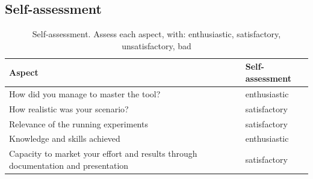 \documentclass[a4paper,12pt]{report}
\begin{document}

\subsection{Self-assessment}

\begin{table}
\begin{tabular}{ll}
Aspect & Self-assessment\\ \hline
How did you manage to master the tool?& enthusiastic\\
How realistic was your scenario? & satisfactory\\
Relevance of the running experiments & satisfactory\\
Knowledge and skills achieved & enthusiastic\\ 
Capacity to market your effort and results through documentation and presentation& satisfactory\\
\hline
\end{tabular}
\caption{Self-assessment. Assess each aspect, with: enthusiastic, satisfactory, unsatisfactory, bad} 
\end{table}
\end{document}
